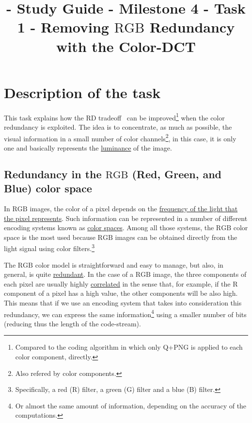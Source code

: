 

\title{\SM{} - Study Guide - Milestone 4 - Task 1 - Removing $\text{RGB}$ Redundancy with the Color-DCT}

\maketitle

\tableofcontents

\section{Description of the task}

This task explains how the RD
tradeoff~\cite{vruiz__information_theory} can be
improved\footnote{Compared to the coding algorithm in which only Q+PNG
is applied to each color component, directly.} when the color
redundancy is exploited. The idea is to concentrate, as much as
possible, the visual information in a small number of color
channels\footnote{Also refered by color components.}, in this case, it
is only one and basically represents the
\href{https://en.wikipedia.org/wiki/Luminance}{luminance} of the
image.


\subsection{Redundancy in the $\text{RGB}$ (Red, Green, and Blue) color space}

In $\text{RGB}$ images, the color of a pixel depends on the
\href{https://en.wikipedia.org/wiki/Visible_spectrum}{frequency of the
  light that the pixel represents}. Such information can be
represented in a number of different encoding systems known as
\href{https://en.wikipedia.org/wiki/Color_space}{color spaces}. Among
all those systems, the $\text{RGB}$ color space is the most used
because $\text{RGB}$ images can be obtained directly from the light
signal using color filters.\footnote{Specifically, a red (R) filter, a
green (G) filter and a blue (B) filter.}

The $\text{RGB}$ color model is straightforward and easy to manage,
but also, in general, is quite
\href{https://en.wikipedia.org/wiki/Data_redundancy}{redundant}. In
the case of a $\text{RGB}$ image, the three components of each pixel
are usually highly
\href{https://en.wikipedia.org/wiki/Correlation_and_dependence}{correlated}
in the sense that, for example, if the $\text{R}$ component of a pixel
has a high value, the other components will be also high. This means
that if we use an encoding system that takes into consideration this
redundancy, we can express the same information\footnote{Or almost the
same amount of information, depending on the accuracy of the
computations.} using a smaller number of bits (reducing thus the
length of the code-stream).

